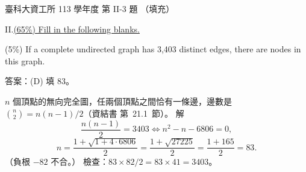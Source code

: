 \begin{pastexam}[label={px:ntust-113-ice-09}]{臺科大資工所 113 學年度 第 II-3 題}
（填充）

II.\quad \underline{(65\%) Fill in the following blanks.}

(5\%) If a complete undirected graph has 3,403 distinct edges, there are  nodes in this
graph.
\end{pastexam}

\begin{pastsoln}
答案：(D) 填 $83$。

$n$ 個頂點的無向完全圖，任兩個頂點之間恰有一條邊，邊數是 $\binom{n}{2} = n(n - 1)/2$（資結書
第~21.1~節）。 解
\[
\frac{n(n - 1)}{2} = 3403 \iff n^2 - n - 6806 = 0 ,
\]
\[
n = \frac{1 + \sqrt{1 + 4 \cdot 6806}}{2} = \frac{1 + \sqrt{27225}}{2} = \frac{1 + 165}{2} = 83 .
\]
（負根 $-82$ 不合。） 檢查：$83 \times 82 / 2 = 83 \times 41 = 3403$。
\end{pastsoln}
